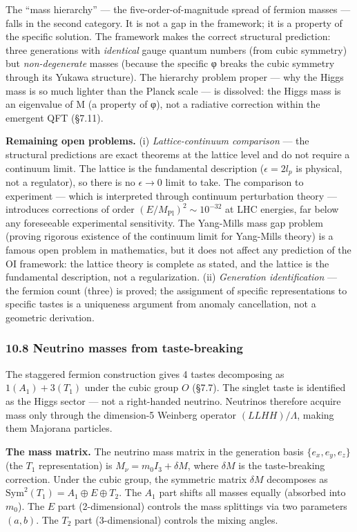 \documentclass[
  11pt,
]{article}
\begin{document}
The ``mass hierarchy'' --- the five-order-of-magnitude spread of fermion
masses --- falls in the second category. It is not a gap in the
framework; it is a property of the specific solution. The framework
makes the correct structural prediction: three generations with
\emph{identical} gauge quantum numbers (from cubic symmetry) but
\emph{non-degenerate} masses (because the specific φ breaks the cubic
symmetry through its Yukawa structure). The hierarchy problem proper ---
why the Higgs mass is so much lighter than the Planck scale --- is
dissolved: the Higgs mass is an eigenvalue of M (a property of φ), not a
radiative correction within the emergent QFT (§7.11).

\textbf{Remaining open problems.} (i) \emph{Lattice-continuum
comparison} --- the structural predictions are exact theorems at the
lattice level and do not require a continuum limit. The lattice is the
fundamental description (\(\epsilon = 2l_p\) is physical, not a
regulator), so there is no \(\epsilon \to 0\) limit to take. The
comparison to experiment --- which is interpreted through continuum
perturbation theory --- introduces corrections of order
\((E/M_{\text{Pl}})^2 \sim 10^{-32}\) at LHC energies, far below any
foreseeable experimental sensitivity. The Yang-Mills mass gap problem
(proving rigorous existence of the continuum limit for Yang-Mills
theory) is a famous open problem in mathematics, but it does not affect
any prediction of the OI framework: the lattice theory is complete as
stated, and the lattice is the fundamental description, not a
regularization. (ii) \emph{Generation identification} --- the fermion
count (three) is proved; the assignment of specific representations to
specific tastes is a uniqueness argument from anomaly cancellation, not
a geometric derivation.

\hypertarget{neutrino-masses-from-taste-breaking}{%
\subsubsection{10.8 Neutrino masses from
taste-breaking}\label{neutrino-masses-from-taste-breaking}}

The staggered fermion construction gives 4 tastes decomposing as
\(1(A_1) + 3(T_1)\) under the cubic group \(O\) (§7.7). The singlet
taste is identified as the Higgs sector --- not a right-handed neutrino.
Neutrinos therefore acquire mass only through the dimension-5 Weinberg
operator \((LLHH)/\Lambda\), making them Majorana particles.

\textbf{The mass matrix.} The neutrino mass matrix in the generation
basis \(\{e_x, e_y, e_z\}\) (the \(T_1\) representation) is
\(M_\nu = m_0 I_3 + \delta M\), where \(\delta M\) is the taste-breaking
correction. Under the cubic group, the symmetric matrix \(\delta M\)
decomposes as \(\mathrm{Sym}^2(T_1) = A_1 \oplus E \oplus T_2\). The
\(A_1\) part shifts all masses equally (absorbed into \(m_0\)). The
\(E\) part (2-dimensional) controls the mass splittings via two
parameters \((a, b)\). The \(T_2\) part (3-dimensional) controls the
mixing angles.
\end{document}
